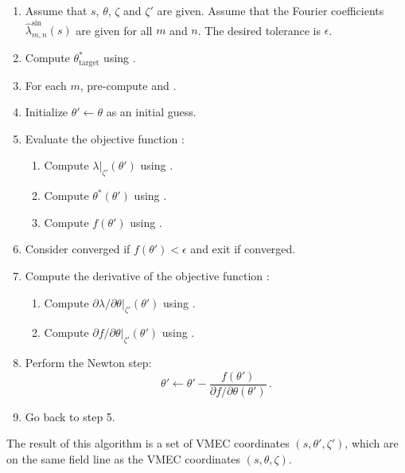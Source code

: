 \begin{enumerate}
 \item Assume that $s$, $\theta$, $\zeta$ and $\zeta'$ are given.
       Assume that the Fourier coefficients $\hat{\lambda}^\textrm{sin}_{m,n}(s)$ are given for all $m$ and $n$.
       The desired tolerance is $\epsilon$.
 \item Compute $\theta^*_\textrm{target}$ using .
 \item For each $m$, pre-compute  and .
 \item Initialize $\theta' \leftarrow \theta$ as an initial guess.
 \item Evaluate the objective function :
       \begin{enumerate}
         \item Compute $\lambda\vert_{\zeta'}(\theta')$ using .
         \item Compute $\theta^*(\theta')$ using .
         \item Compute $f(\theta')$ using .
       \end{enumerate}
 \item Consider converged if $f(\theta') < \epsilon$ and exit if converged.
 \item Compute the derivative of the objective function :
       \begin{enumerate}
         \item Compute $\partial \lambda / \partial \theta \vert_{\zeta'}(\theta')$ using .
         \item Compute $\partial f / \partial \theta\vert_{\zeta'}(\theta')$ using .
       \end{enumerate}
 \item Perform the Newton step:
       \begin{equation}
         \theta' \leftarrow \theta' - \frac{f(\theta')}{\partial f / \partial \theta (\theta')} \, . \nonumber
       \end{equation}
 \item Go back to step 5.
\end{enumerate}
The result of this algorithm is a set of VMEC coordinates $(s,\theta',\zeta')$,
which are on the same field line as the VMEC coordinates $(s,\theta,\zeta)$.


